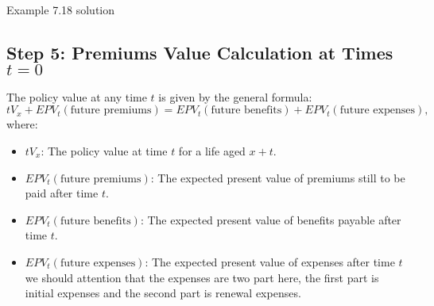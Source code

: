 \begin{solve}{}{Example 7.18 solution}
		
		\subsection*{Step 5: Premiums Value Calculation at Times \(t = 0\)}
		
		The policy value at any time \(t\) is given by the general formula:
		\[
		tV_x + EPV_t(\text{future premiums}) = EPV_t(\text{future benefits}) + EPV_t(\text{future expenses}),
		\]
		where:
		\begin{itemize}
			\item \(tV_x\): The policy value at time \(t\) for a life aged \(x+t\).
			\item \(EPV_t(\text{future premiums})\): The expected present value of premiums still to be paid after time \(t\).
			\item \(EPV_t(\text{future benefits})\): The expected present value of benefits payable after time \(t\).
			\item \(EPV_t(\text{future expenses})\): The expected present value of expenses after time \(t\) we should attention that the expenses are two part here, the first part is initial expenses and the second part is renewal expenses.
		\end{itemize}
		

\end{solve}
